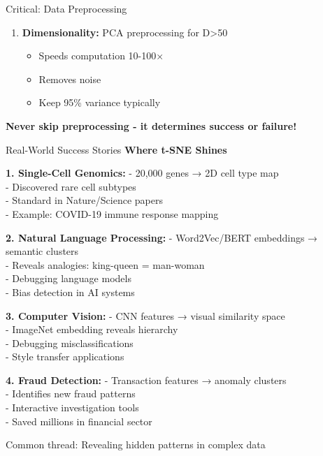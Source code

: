 \documentclass[10pt]{beamer}
\newcommand{\emphtext}[1]{\textcolor{upcblue}{\textbf{#1}}}
\newcommand{\warningbox}[1]{\colorbox{red!10}{\begin{minipage}{0.85\textwidth}\centering #1\end{minipage}}}
\newcommand{\conceptbox}[1]{\colorbox{upcblue!10}{\begin{minipage}{0.85\textwidth}\centering #1\end{minipage}}}
\begin{document}
\begin{frame}{Critical: Data Preprocessing}
\begin{enumerate}
\item \textbf{Dimensionality:} PCA preprocessing for D>50
   \begin{itemize}
   \tiny
   \item Speeds computation 10-100×
   \item Removes noise
   \item Keep 95\% variance typically
   \end{itemize}
\end{enumerate}

\vspace{0.3cm}
\begin{center}
\warningbox{\footnotesize\textbf{Never skip preprocessing - it determines success or failure!}}
\end{center}
\end{frame}

\begin{frame}{Real-World Success Stories}
\emphtext{Where t-SNE Shines}

\vspace{0.3cm}
\textbf{1. Single-Cell Genomics:}
\footnotesize
- 20,000 genes → 2D cell type map\\
- Discovered rare cell subtypes\\
- Standard in Nature/Science papers\\
- Example: COVID-19 immune response mapping

\vspace{0.2cm}
\textbf{2. Natural Language Processing:}
\footnotesize
- Word2Vec/BERT embeddings → semantic clusters\\
- Reveals analogies: king-queen = man-woman\\
- Debugging language models\\
- Bias detection in AI systems

\vspace{0.2cm}
\textbf{3. Computer Vision:}
\footnotesize
- CNN features → visual similarity space\\
- ImageNet embedding reveals hierarchy\\
- Debugging misclassifications\\
- Style transfer applications

\vspace{0.2cm}
\textbf{4. Fraud Detection:}
\footnotesize
- Transaction features → anomaly clusters\\
- Identifies new fraud patterns\\
- Interactive investigation tools\\
- Saved millions in financial sector

\begin{center}
\conceptbox{\footnotesize Common thread: Revealing hidden patterns in complex data}
\end{center}
\end{frame}
\end{document}
